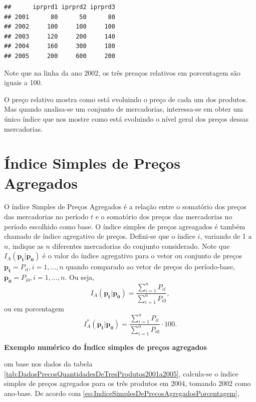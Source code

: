 \documentclass[
]{book}
\begin{document}
\begin{verbatim}
##      iprprd1 iprprd2 iprprd3
## 2001      80      50      80
## 2002     100     100     100
## 2003     120     200     140
## 2004     160     300     180
## 2005     200     600     200
\end{verbatim}

Note que na linha da ano 2002, os três preaços relativos em porcentagem são iguais a 100.

O preço relativo mostra como está evoluindo o preço de cada um dos produtos. Mas quando analisa-se um conjunto de mercadorias, interessa-se em obter um único índice que nos mostre como está evoluindo o nível geral dos preços dessas mercadorias.

\hypertarget{uxedndice-simples-de-preuxe7os-agregados}{%
\section{Índice Simples de Preços Agregados}\label{uxedndice-simples-de-preuxe7os-agregados}}

O índice Simples de Preços Agregados é a relação entre o somatório dos preços das mercadorias no período \(t\) e o somatório dos preços das mercadorias no período escolhido como base.
O índice simples de preços agreagados é também chamado de índice agregativo de preços.
Defini-se que o índice \(i\), variando de 1 a \(n\), indique as \(n\) diferentes mercadorias do conjunto considerado.
Note que \(I_A(\mathbf{p_t}|\mathbf{p_0})\) é o valor do índice agregativo para o vetor ou conjunto de preços \(\mathbf{p_t} = {P_{it},i=1,\ldots, n}\) quando comparado ao vetor de preços do período-base, \(\mathbf{p_0} = {P_{i0},i=1,\ldots, n}\). Ou seja,
\begin{equation}
  I_A(\mathbf{p_t}| \mathbf{p_0}) =
  \frac{\sum_{i=1}^{n}P_{it}}{\sum_{i=1}^{n}P_{i0}},
  \label{eq:IndiceSimplesDePrecosAgregados}
\end{equation}
ou em porcentagem
\begin{equation}
  I_A^*(\mathbf{p_t}| \mathbf{p_0}) =
  \frac{\sum_{i=1}^{n}P_{it}}{\sum_{i=1}^{n}P_{i0}} \cdot 100.
  \label{eq:IndiceSimplesDePrecosAgregadosPorcentagem}
\end{equation}

\textbf{Exemplo numérico do Índice simples de preços agregados}

om base nos dados da tabela \ref{tab:DadosPrecosQuantidadesDeTresProdutos2001a2005}, calcula-se o índice simples de preços agregados para os três produtos em 2004, tomando 2002 como ano-base. De acordo com \eqref{eq:IndiceSimplesDePrecosAgregadosPorcentagem},
\end{document}
